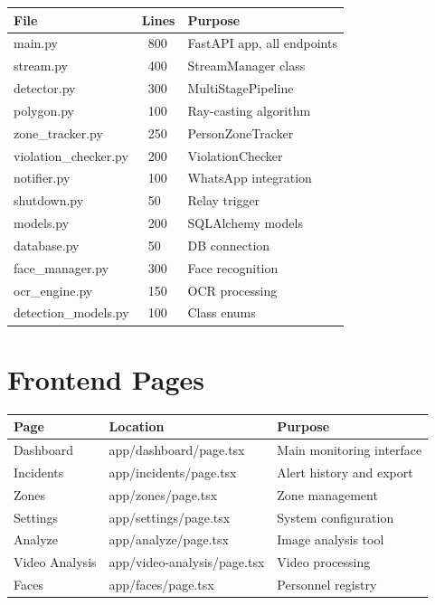 \documentclass[12pt,a4paper,oneside]{book}
\begin{document}
\begin{longtable}{|l|l|p{6cm}|}
    \hline
    \textbf{File} & \textbf{Lines} & \textbf{Purpose} \\
    \hline
    main.py & ~800 & FastAPI app, all endpoints \\
    \hline
    stream.py & ~400 & StreamManager class \\
    \hline
    detector.py & ~300 & MultiStagePipeline \\
    \hline
    polygon.py & ~100 & Ray-casting algorithm \\
    \hline
    zone\_tracker.py & ~250 & PersonZoneTracker \\
    \hline
    violation\_checker.py & ~200 & ViolationChecker \\
    \hline
    notifier.py & ~100 & WhatsApp integration \\
    \hline
    shutdown.py & ~50 & Relay trigger \\
    \hline
    models.py & ~200 & SQLAlchemy models \\
    \hline
    database.py & ~50 & DB connection \\
    \hline
    face\_manager.py & ~300 & Face recognition \\
    \hline
    ocr\_engine.py & ~150 & OCR processing \\
    \hline
    detection\_models.py & ~100 & Class enums \\
    \hline
\end{longtable}

\section{Frontend Pages}

\begin{longtable}{|l|l|p{6cm}|}
    \hline
    \textbf{Page} & \textbf{Location} & \textbf{Purpose} \\
    \hline
    Dashboard & app/dashboard/page.tsx & Main monitoring interface \\
    \hline
    Incidents & app/incidents/page.tsx & Alert history and export \\
    \hline
    Zones & app/zones/page.tsx & Zone management \\
    \hline
    Settings & app/settings/page.tsx & System configuration \\
    \hline
    Analyze & app/analyze/page.tsx & Image analysis tool \\
    \hline
    Video Analysis & app/video-analysis/page.tsx & Video processing \\
    \hline
    Faces & app/faces/page.tsx & Personnel registry \\
    \hline
\end{longtable}
\end{document}
